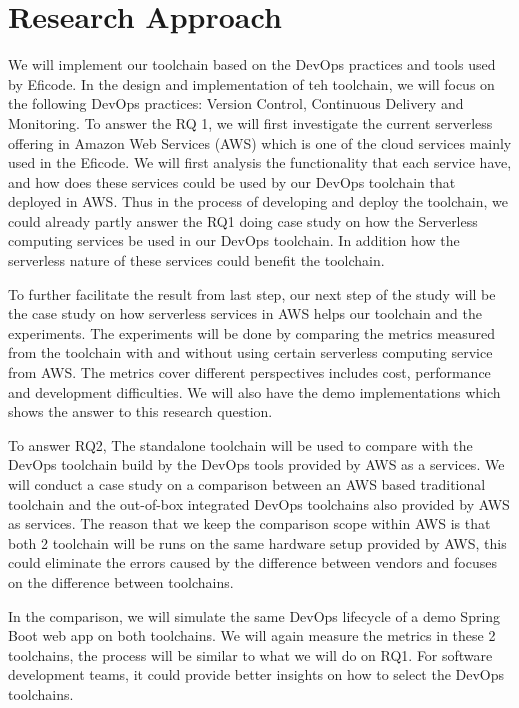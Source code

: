 \section{Research Approach}
We will implement our toolchain based on the DevOps practices and tools used by Eficode. In the design and implementation of teh toolchain, we will focus on the following DevOps practices: Version Control, Continuous Delivery and Monitoring.
To answer the RQ 1, we will first investigate the current serverless offering in Amazon Web Services (AWS) which is one of the cloud services mainly used in the Eficode. We will first analysis the functionality that each service have, and how does these services could be used by our DevOps toolchain that deployed in AWS. 
Thus in the process of developing and deploy the toolchain, we could already partly answer the RQ1 doing case study on how the Serverless computing services be used in our DevOps toolchain. In addition how the serverless nature of these services could benefit the toolchain.
\par
To further facilitate the result from last step, our next step of the study will be the case study on how serverless services in AWS helps our toolchain and the experiments.
The experiments will be done by comparing the metrics measured from the toolchain with and without using certain serverless computing service from AWS. The metrics cover different perspectives includes cost, performance and development difficulties. We will also have the demo implementations which shows the answer to this research question.
\par
To answer RQ2, The standalone toolchain will be used to compare with the DevOps toolchain build by the DevOps tools provided by AWS as a services. We will conduct a case study on a comparison between an AWS based traditional toolchain and the out-of-box integrated DevOps toolchains also provided by AWS as services. The reason that we keep the comparison scope within AWS is that both 2 toolchain will be runs on the same hardware setup provided by AWS, this could eliminate the errors caused by the difference between vendors and focuses on the difference between toolchains.
\par
In the comparison, we will simulate the same DevOps lifecycle of a demo Spring Boot web app on both toolchains. We will again measure the metrics in these 2 toolchains, the process will be similar to what we will do on RQ1.
For software development teams, it could provide better insights on how to select the DevOps toolchains.
